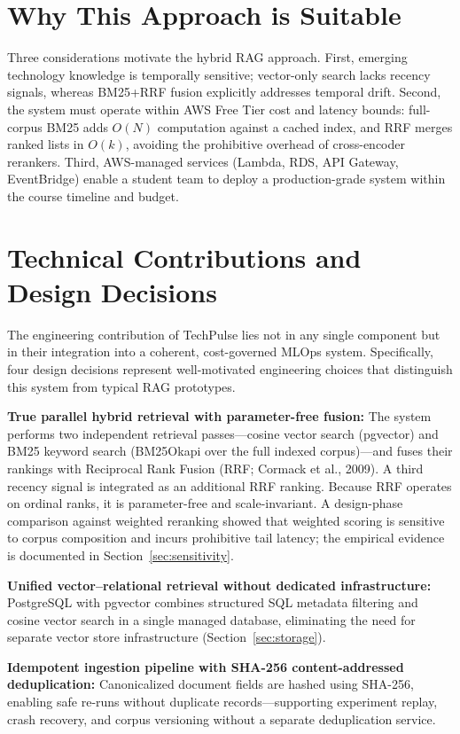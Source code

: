 \section{Why This Approach is Suitable}
\label{sec:method_rationale}

Three considerations motivate the hybrid RAG approach. First, emerging technology knowledge is temporally sensitive; vector-only search lacks recency signals, whereas BM25+RRF fusion explicitly addresses temporal drift. Second, the system must operate within AWS Free Tier cost and latency bounds: full-corpus BM25 adds $O(N)$ computation against a cached index, and RRF merges ranked lists in $O(k)$, avoiding the prohibitive overhead of cross-encoder rerankers. Third, AWS-managed services (Lambda, RDS, API Gateway, EventBridge) enable a student team to deploy a production-grade system within the course timeline and budget.

\section{Technical Contributions and Design Decisions}
\label{sec:innovation}

The engineering contribution of TechPulse lies not in any single component but in their integration into a coherent, cost-governed MLOps system. Specifically, four design decisions represent well-motivated engineering choices that distinguish this system from typical RAG prototypes.

\textbf{True parallel hybrid retrieval with parameter-free fusion:} The system performs two independent retrieval passes---cosine vector search (pgvector) and BM25 keyword search (BM25Okapi over the full indexed corpus)---and fuses their rankings with Reciprocal Rank Fusion (RRF; Cormack et al., 2009). A third recency signal is integrated as an additional RRF ranking. Because RRF operates on ordinal ranks, it is parameter-free and scale-invariant. A design-phase comparison against weighted reranking showed that weighted scoring is sensitive to corpus composition and incurs prohibitive tail latency; the empirical evidence is documented in Section~\ref{sec:sensitivity}.

\textbf{Unified vector--relational retrieval without dedicated infrastructure:} PostgreSQL with pgvector combines structured SQL metadata filtering and cosine vector search in a single managed database, eliminating the need for separate vector store infrastructure (Section~\ref{sec:storage}).

\textbf{Idempotent ingestion pipeline with SHA-256 content-addressed deduplication:} Canonicalized document fields are hashed using SHA-256, enabling safe re-runs without duplicate records---supporting experiment replay, crash recovery, and corpus versioning without a separate deduplication service.

